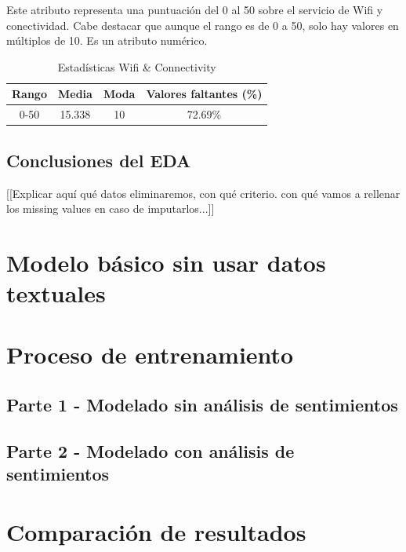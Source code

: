 \documentclass[12pt]{report} %
\begin{document}
    Este atributo representa una puntuación del 0 al 50 sobre el servicio de Wifi y conectividad.
    Cabe destacar que aunque el rango es de 0 a 50, solo hay valores en múltiplos de 10.
    Es un atributo numérico.

    \begin{table}[H]
        \begin{center}
            \begin{tabular}{ @{}cccc@{} }
                \toprule
                Rango & Media & Moda & Valores faltantes (\%) \\
                \midrule
                0-50 & 15.338 & 10 & 72.69\% \\
                \bottomrule
            \end{tabular}
            \caption{Estadísticas Wifi \& Connectivity}
        \end{center}
    \end{table}
    
    \section{Conclusiones del EDA}
    [[Explicar aquí qué datos eliminaremos, con qué criterio. con qué vamos a rellenar los missing values en caso de imputarlos...]]

\chapter{Modelo básico sin usar datos textuales}
\label{chap:basicModel}

\chapter{Proceso de entrenamiento}
\label{chap:train}

\section{Parte 1 - Modelado sin análisis de sentimientos}
\label{sec:parte1}

\section{Parte 2 - Modelado con análisis de sentimientos}
\label{sec:parte2}

\chapter{Comparación de resultados}
\label{chap:resultados}
\end{document}
